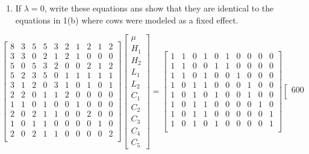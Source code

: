 \documentclass[12pt,a4paper]{paper}
\begin{document}
\begin{enumerate}
\begin{enumerate}
\begin{minipage}[c]{0.15\linewidth}
\end{minipage}
\item If $\lambda = 0$, write these equations ans show that they are identical to the equations in 1(b) where cows were modeled as a fixed effect.
\end{enumerate}
\[\left[\begin{array}{cccccccccc}
8 & 3 & 5 & 5 & 3 & 2 & 1 & 2 & 1 & 2 \\ 
  3 & 3 & 0 & 2 & 1 & 2 & 1 & 0 & 0 & 0 \\ 
  5 & 0 & 5 & 3 & 2 & 0 & 0 & 2 & 1 & 2 \\ 
  5 & 2 & 3 & 5 & 0 & 1 & 1 & 1 & 1 & 1 \\ 
  3 & 1 & 2 & 0 & 3 & 1 & 0 & 1 & 0 & 1 \\ 
  2 & 2 & 0 & 1 & 1 & 2 & 0 & 0 & 0 & 0 \\ 
  1 & 1 & 0 & 1 & 0 & 0 & 1 & 0 & 0 & 0 \\ 
  2 & 0 & 2 & 1 & 1 & 0 & 0 & 2 & 0 & 0 \\ 
  1 & 0 & 1 & 1 & 0 & 0 & 0 & 0 & 1 & 0 \\ 
  2 & 0 & 2 & 1 & 1 & 0 & 0 & 0 & 0 & 2 \\ 
\end{array}\right]
\left[\begin{array}{c}\mu\\H_{1}\\H_{2}\\L_{1}\\L_{2}\\C_{1}\\C_{2}\\C_{3}\\C_{4}\\C_{5}\end{array}\right] = \left[\begin{array}{cccccccccc}
1 & 1 & 0 & 1 & 0 & 1 & 0 & 0 & 0 & 0 \\ 
  1 & 1 & 0 & 0 & 1 & 1 & 0 & 0 & 0 & 0 \\ 
  1 & 1 & 0 & 1 & 0 & 0 & 1 & 0 & 0 & 0 \\ 
  1 & 0 & 1 & 1 & 0 & 0 & 0 & 1 & 0 & 0 \\ 
  1 & 0 & 1 & 0 & 1 & 0 & 0 & 1 & 0 & 0 \\ 
  1 & 0 & 1 & 1 & 0 & 0 & 0 & 0 & 1 & 0 \\ 
  1 & 0 & 1 & 1 & 0 & 0 & 0 & 0 & 0 & 1 \\ 
  1 & 0 & 1 & 0 & 1 & 0 & 0 & 0 & 0 & 1 \\ 
  \end{array}\right]\left[\begin{array}{c}600 \\ 

\end{array}\]
\end{enumerate}
\end{document}
